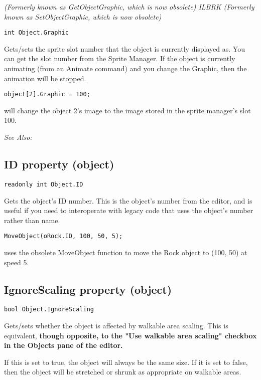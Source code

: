 \it{(Formerly known as GetObjectGraphic, which is now obsolete)} ILBRK
\it{(Formerly known as SetObjectGraphic, which is now obsolete)}

\begin{verbatim}
int Object.Graphic
\end{verbatim}
Gets/sets the sprite slot number that the object is currently displayed as.
You can get the slot number from the Sprite Manager. If the object is
currently animating (from an Animate command) and you change the Graphic, then the
animation will be stopped.

\begin{verbatim}
object[2].Graphic = 100;
\end{verbatim}
will change the object 2's image to the image stored in the sprite manager's slot 100.

\it{See Also:} 


\subsection{ID property (object)}\label{Object.ID}%

\begin{verbatim}
readonly int Object.ID
\end{verbatim}
Gets the object's ID number. This is the object's number from the editor, and is
useful if you need to interoperate with legacy code that uses the object's number
rather than name.

\begin{verbatim}
MoveObject(oRock.ID, 100, 50, 5);
\end{verbatim}
uses the obsolete MoveObject function to move the Rock object to (100, 50) at speed 5.


\subsection{IgnoreScaling property (object)}\label{Object.IgnoreScaling}%

\begin{verbatim}
bool Object.IgnoreScaling
\end{verbatim}
Gets/sets whether the object is affected by walkable area scaling. This is equivalent,
\bf{though opposite}, to the "Use walkable area scaling" checkbox in the Objects pane of the editor.

If this is set to true, the object will always be the same size. If it is set to false, then
the object will be stretched or shrunk as appropriate on walkable areas.

